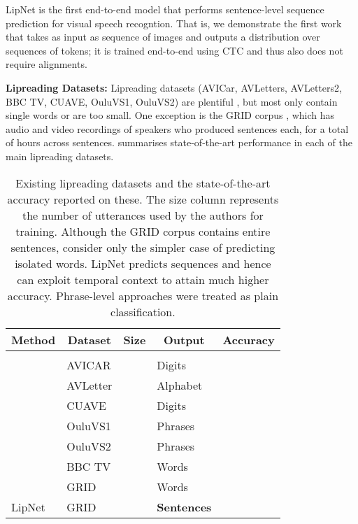 \documentclass{article}
\newcommand{\minisec}[1]{\textbf{#1:}}
\begin{document}
LipNet is the first end-to-end model that performs sentence-level sequence prediction for visual speech recogntion. That is, we demonstrate the first work that takes as input as sequence of images and outputs a distribution over sequences of tokens; it is trained end-to-end using CTC and thus also does not require alignments.


\minisec{Lipreading Datasets}
Lipreading datasets (AVICar, AVLetters, AVLetters2, BBC TV, CUAVE, OuluVS1, OuluVS2) are plentiful \citep{zhou2014review,chung2016lip}, but most only contain single words or are too small.
One exception is the GRID corpus \citep{cooke2006audio}, which has audio and video recordings of  speakers who produced  sentences each, for a total of  hours across  sentences.  summarises state-of-the-art performance in each of the main lipreading datasets.

\begin{table}[htb]
    \caption{Existing lipreading datasets and the state-of-the-art accuracy reported on these. The size column represents the number of utterances used by the authors for training. Although the GRID corpus contains entire sentences, \cite{gergen2016dynamic} consider only the simpler case of predicting isolated words. LipNet predicts sequences and hence can exploit temporal context to attain much higher accuracy. Phrase-level approaches were treated as plain classification.}
\label{tbl:datasets}
\begin{center}
\begin{tabular}{llrlr}
\multicolumn{1}{c}{\bf Method}  &\multicolumn{1}{c}{\bf Dataset}  &\multicolumn{1}{c}{\bf Size}  &\multicolumn{1}{c}{\bf Output}  &\multicolumn{1}{c}{\bf Accuracy}
\\ \hline \\
\cite{fu2008classification} & AVICAR &  & Digits &  \\
\cite{hu2016temporal} & AVLetter &  & Alphabet &  \\
\cite{papandreou2009adaptive} & CUAVE &  & Digits &  \\
\cite{chung2016lip} & OuluVS1 &  & Phrases &  \\
\cite{chung2016out} & OuluVS2 &  & Phrases &  \\
\cite{chung2016lip} & BBC TV &  & Words &  \\
\cite{gergen2016dynamic} & GRID &  & Words &  \\
LipNet & GRID &  & \textbf{Sentences} &  \\
\end{tabular}
\end{center}
\end{table}
\end{document}
